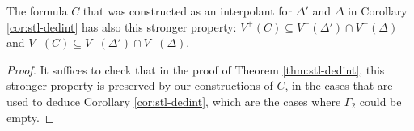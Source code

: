 \begin{thm}\label{thm:stl-lyndon}
  The formula $C$ that was constructed as an interpolant for $\Delta'$ and $\Delta$ in Corollary \ref{cor:stl-dedint} has also this stronger property: $V^+(C) \subseteq V^+(\Delta') \cap V^+(\Delta)$ and $V^-(C) \subseteq V^-(\Delta') \cap V^-(\Delta)$.
\end{thm}
\begin{proof}
  It suffices to check that in the proof of Theorem \ref{thm:stl-dedint}, this stronger property is preserved by our constructions of $C$, in the cases that are used to deduce Corollary \ref{cor:stl-dedint}, which are the cases where $\Gamma_2$ could be empty.
\end{proof}